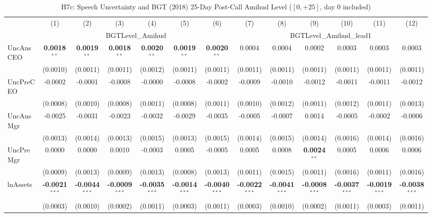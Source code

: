 \documentclass[11pt,a4paper]{article}
\begin{document}
\begin{table}[htbp]
\centering
\caption{H7c: Speech Uncertainty and BGT (2018) 25-Day Post-Call Amihud Level ($[0,+25]$, day 0 included)}
\label{tab:h7c}
\scriptsize
\begin{tabular}{lcccccccccccc}
\toprule
 & (1) & (2) & (3) & (4) & (5) & (6) & (7) & (8) & (9) & (10) & (11) & (12) \\
 & \multicolumn{6}{c}{BGTLevel\_Amihud} & \multicolumn{6}{c}{BGTLevel\_Amihud\_lead1} \\
\cmidrule(lr){2-7} \cmidrule(lr){8-13}
\midrule
UncAnsCEO & \textbf{0.0018}$^{**}$ & \textbf{0.0019}$^{**}$ & \textbf{0.0018}$^{**}$ & \textbf{0.0020}$^{**}$ & \textbf{0.0019}$^{**}$ & \textbf{0.0020}$^{**}$ & 0.0004 & 0.0004 & 0.0002 & 0.0003 & 0.0003 & 0.0003 \\
 & (0.0010) & (0.0011) & (0.0011) & (0.0012) & (0.0011) & (0.0011) & (0.0011) & (0.0011) & (0.0011) & (0.0011) & (0.0011) & (0.0011) \\
UncPreCEO & -0.0002 & -0.0001 & -0.0008 & -0.0000 & -0.0008 & -0.0002 & -0.0009 & -0.0010 & -0.0012 & -0.0011 & -0.0011 & -0.0012 \\
 & (0.0008) & (0.0010) & (0.0008) & (0.0011) & (0.0008) & (0.0011) & (0.0010) & (0.0012) & (0.0011) & (0.0012) & (0.0011) & (0.0013) \\
UncAnsMgr & -0.0025 & -0.0031 & -0.0023 & -0.0032 & -0.0029 & -0.0035 & -0.0005 & -0.0007 & 0.0014 & -0.0005 & -0.0002 & -0.0006 \\
 & (0.0013) & (0.0014) & (0.0013) & (0.0015) & (0.0013) & (0.0015) & (0.0014) & (0.0015) & (0.0014) & (0.0016) & (0.0014) & (0.0016) \\
UncPreMgr & 0.0000 & 0.0000 & 0.0010 & -0.0003 & 0.0005 & -0.0005 & 0.0005 & 0.0008 & \textbf{0.0024}$^{**}$ & 0.0005 & 0.0006 & 0.0006 \\
 & (0.0009) & (0.0013) & (0.0009) & (0.0013) & (0.0008) & (0.0013) & (0.0011) & (0.0015) & (0.0011) & (0.0016) & (0.0011) & (0.0016) \\
\midrule
lnAssets & \textbf{-0.0021}$^{***}$ & \textbf{-0.0044}$^{***}$ & \textbf{-0.0009}$^{***}$ & \textbf{-0.0035}$^{***}$ & \textbf{-0.0014}$^{***}$ & \textbf{-0.0040}$^{***}$ & \textbf{-0.0022}$^{***}$ & \textbf{-0.0041}$^{***}$ & \textbf{-0.0008}$^{***}$ & \textbf{-0.0037}$^{***}$ & \textbf{-0.0019}$^{***}$ & \textbf{-0.0038}$^{***}$ \\
 & (0.0003) & (0.0010) & (0.0002) & (0.0011) & (0.0003) & (0.0011) & (0.0003) & (0.0010) & (0.0002) & (0.0011) & (0.0003) & (0.0011) \\

\end{tabular}
\end{table}
\end{document}
